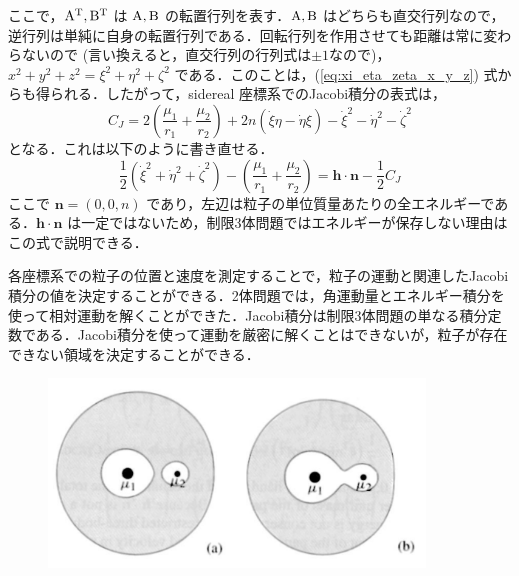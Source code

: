 \documentclass[11pt,a4paper,oneside,onecolumn]{jarticle}
\begin{document}
ここで，${\rm A}^{\rm T}, {\rm B}^{\rm T}$ は ${\rm A}, {\rm B}$ の転置行列を表す．${\rm A}, {\rm B}$ はどちらも直交行列なので，逆行列は単純に自身の転置行列である．回転行列を作用させても距離は常に変わらないので (言い換えると，直交行列の行列式は$\pm 1$なので)，$x^2 + y^2 + z^2 = \xi^2 + \eta^2 + \zeta^2$ である．このことは，(\ref{eq:xi_eta_zeta_x_y_z}) 式からも得られる．したがって，sidereal 座標系でのJacobi積分の表式は，
\begin{equation}
C_J = 2 \left( \frac{\mu_1}{r_1} + \frac{\mu_2}{r_2} \right) + 2 n (\dot{\xi} \eta - \dot{\eta} \xi) - \dot{\xi}^2 - \dot{\eta}^2 - \dot{\zeta}^2 \label{eq:C_J}
\end{equation}
となる．これは以下のように書き直せる．
\begin{equation}
 \frac{1}{2} (\dot{\xi}^2 + \dot{\eta}^2 + \dot{\zeta}^2) - \left( \frac{\mu_1}{r_1} + \frac{\mu_2}{r_2} \right) = {\bm h} \cdot {\bm n} - \frac{1}{2} C_J
\end{equation}
ここで ${\bm n} = (0, 0, n)$ であり，左辺は粒子の単位質量あたりの全エネルギーである．${\bm h} \cdot {\bm n}$ は一定ではないため，制限3体問題ではエネルギーが保存しない理由はこの式で説明できる．

各座標系での粒子の位置と速度を測定することで，粒子の運動と関連したJacobi積分の値を決定することができる．2体問題では，角運動量とエネルギー積分を使って相対運動を解くことができた．Jacobi積分は制限3体問題の単なる積分定数である．Jacobi積分を使って運動を厳密に解くことはできないが，粒子が存在できない領域を決定することができる．

\begin{figure}[H]
\centering
\includegraphics[width=10cm]{./image/sec3_2.pdf}
\caption{\label{fig:zerovelo}}
\end{figure}
\end{document}
